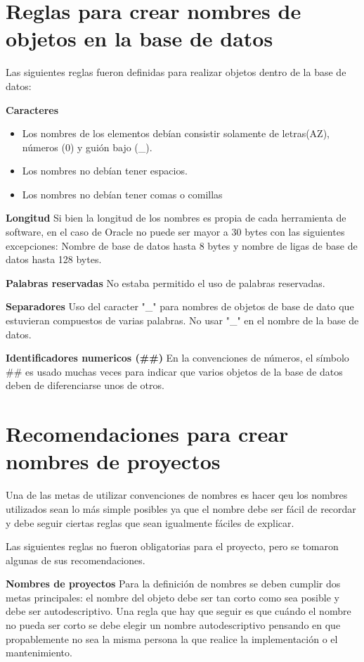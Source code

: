 \section{Reglas para crear nombres de objetos en la base de datos}

Las siguientes reglas fueron definidas para realizar objetos dentro de la base de datos:

\textbf{Caracteres}
\begin{itemize}[*]
\item Los nombres de los elementos debían consistir solamente de letras(A\-Z), números (0) y guión bajo (\_).
\item Los nombres no debían tener espacios.
\item Los nombres no debían tener comas o comillas
\end{itemize}

\textbf{Longitud}
Si bien la longitud de los nombres es propia de cada herramienta de software, en el caso de Oracle no puede ser mayor a 30 bytes con las 
siguientes excepciones: Nombre de base de datos hasta 8 bytes y nombre de ligas de base de datos hasta 128 bytes.

\textbf{Palabras reservadas}
No estaba permitido el uso de palabras reservadas.

\textbf{Separadores}
Uso del caracter "\_" para nombres de objetos de base de dato que estuvieran compuestos de varias palabras. No usar "\_" en el nombre de la base de datos.

\textbf{Identificadores numericos (##)}
En la convenciones de números, el símbolo \#\# es usado muchas veces para indicar que varios objetos de la base de datos deben de diferenciarse 
unos de otros.


\section{Recomendaciones para crear nombres de proyectos}
Una de las metas de utilizar convenciones de nombres es hacer qeu los nombres utilizados sean lo más simple posibles 
ya que el nombre debe ser fácil de recordar y debe seguir ciertas reglas que sean igualmente fáciles de explicar. 

Las siguientes reglas no fueron obligatorias para el proyecto, pero se tomaron algunas de sus recomendaciones.

\textbf{Nombres de proyectos}
Para la definición de nombres se deben cumplir dos metas principales: el nombre del objeto debe ser tan corto como sea posible y 
debe ser autodescriptivo. Una regla que hay que seguir es que cuándo el nombre no pueda ser corto se debe elegir un nombre autodescriptivo 
pensando en que propablemente no sea la misma persona la que realice la implementación o el mantenimiento.

